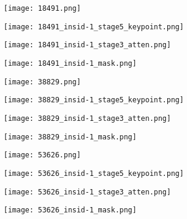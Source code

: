 \begin{figure}[htbp]
\begin{minipage}[t]{\linewidth}
		\vskip5pt
		\begin{minipage}[t]{0.23\linewidth}
			\texttt{[image: 18491.png]}
		\end{minipage}
		\begin{minipage}[t]{0.23\linewidth}
			\texttt{[image: 18491\_insid-1\_stage5\_keypoint.png]}
		\end{minipage}
		\begin{minipage}[t]{0.23\linewidth}
			\texttt{[image: 18491\_insid-1\_stage3\_atten.png]}
		\end{minipage}
		\begin{minipage}[t]{0.23\linewidth}
			\texttt{[image: 18491\_insid-1\_mask.png]}
		\end{minipage}
		
		\vskip5pt
		\begin{minipage}[t]{0.23\linewidth}
			\texttt{[image: 38829.png]}
		\end{minipage}
		\begin{minipage}[t]{0.23\linewidth}
			\texttt{[image: 38829\_insid-1\_stage5\_keypoint.png]}
		\end{minipage}
		\begin{minipage}[t]{0.23\linewidth}
			\texttt{[image: 38829\_insid-1\_stage3\_atten.png]}
		\end{minipage}
		\begin{minipage}[t]{0.23\linewidth}
			\texttt{[image: 38829\_insid-1\_mask.png]}
		\end{minipage}
		
		\vskip5pt
		\begin{minipage}[t]{0.23\linewidth}
			\texttt{[image: 53626.png]}
		\end{minipage}
		\begin{minipage}[t]{0.23\linewidth}
			\texttt{[image: 53626\_insid-1\_stage5\_keypoint.png]}
		\end{minipage}
		\begin{minipage}[t]{0.23\linewidth}
			\texttt{[image: 53626\_insid-1\_stage3\_atten.png]}
		\end{minipage}
		\begin{minipage}[t]{0.23\linewidth}
			\texttt{[image: 53626\_insid-1\_mask.png]}
		\end{minipage}
		

\end{minipage}
\end{figure}
